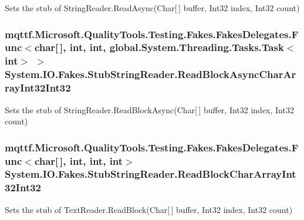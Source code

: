 Sets the stub of String\-Reader.\-Read\-Async(\-Char\mbox{[}$\,$\mbox{]} buffer, Int32 index, Int32 count)

\hypertarget{class_system_1_1_i_o_1_1_fakes_1_1_stub_string_reader_ab3ec4f381ac0fdb3b1099f7d38d4f727}{
\subsubsection[{Read\-Block\-Async\-Char\-Array\-Int32\-Int32}]{\setlength{\rightskip}{0pt plus 5cm}mqttf.\-Microsoft.\-Quality\-Tools.\-Testing.\-Fakes.\-Fakes\-Delegates.\-Func$<$char\mbox{[}$\,$\mbox{]}, int, int, global.\-System.\-Threading.\-Tasks.\-Task$<$int$>$ $>$ System.\-I\-O.\-Fakes.\-Stub\-String\-Reader.\-Read\-Block\-Async\-Char\-Array\-Int32\-Int32}}\label{class_system_1_1_i_o_1_1_fakes_1_1_stub_string_reader_ab3ec4f381ac0fdb3b1099f7d38d4f727}


Sets the stub of String\-Reader.\-Read\-Block\-Async(\-Char\mbox{[}$\,$\mbox{]} buffer, Int32 index, Int32 count)

\hypertarget{class_system_1_1_i_o_1_1_fakes_1_1_stub_string_reader_a6b63abe8393141c7d63586d136e1d391}{
\subsubsection[{Read\-Block\-Char\-Array\-Int32\-Int32}]{\setlength{\rightskip}{0pt plus 5cm}mqttf.\-Microsoft.\-Quality\-Tools.\-Testing.\-Fakes.\-Fakes\-Delegates.\-Func$<$char\mbox{[}$\,$\mbox{]}, int, int, int$>$ System.\-I\-O.\-Fakes.\-Stub\-String\-Reader.\-Read\-Block\-Char\-Array\-Int32\-Int32}}\label{class_system_1_1_i_o_1_1_fakes_1_1_stub_string_reader_a6b63abe8393141c7d63586d136e1d391}


Sets the stub of Text\-Reader.\-Read\-Block(\-Char\mbox{[}$\,$\mbox{]} buffer, Int32 index, Int32 count)

